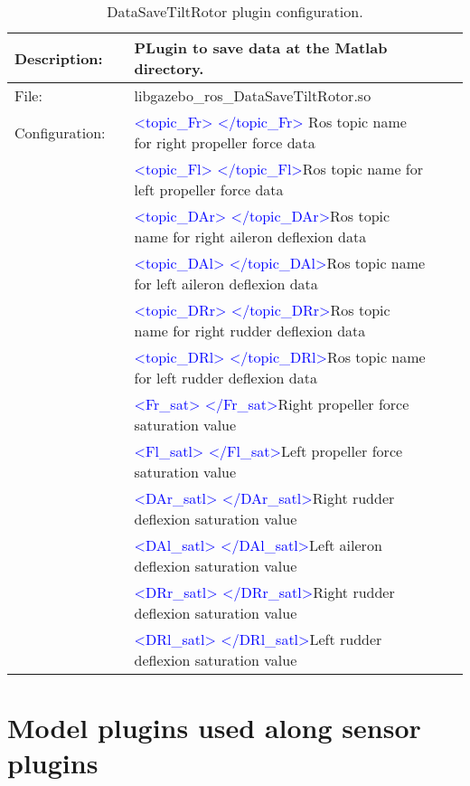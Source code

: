     \begin{table}[h]
	\centering
	\begin{tabular}{|rr|lrr|}
		\hline
		\multicolumn{1}{|l}{Description: } &       & PLugin to save data at the Matlab directory. &       &     \\
		\hline
		\multicolumn{1}{|l}{File: } &       & libgazebo\_ros\_DataSaveTiltRotor.so &       &         \\
		\hline
		\multicolumn{1}{|l}{Configuration: } &       & \textcolor{blue}{<topic\_Fr> </topic\_Fr>} Ros topic name for right propeller force data&           &  \\
		&       & \textcolor{blue}{<topic\_Fl> </topic\_Fl>}Ros topic name for left propeller force data &        &  \\
		&       & \textcolor{blue}{<topic\_DAr> </topic\_DAr>}Ros topic name for right aileron deflexion data &        &  \\
		&       & \textcolor{blue}{<topic\_DAl> </topic\_DAl>}Ros topic name for left aileron deflexion data &        &  \\
		&       & \textcolor{blue}{<topic\_DRr> </topic\_DRr>}Ros topic name for right rudder deflexion data &        &  \\
		&       & \textcolor{blue}{<topic\_DRl> </topic\_DRl>}Ros topic name for left rudder deflexion data &        &  \\
		&       & \textcolor{blue}{<Fr\_sat> </Fr\_sat>}Right propeller force saturation value &        &  \\
		&       & \textcolor{blue}{<Fl\_satl> </Fl\_sat>}Left propeller force saturation value &        &  \\
		&       & \textcolor{blue}{<DAr\_satl> </DAr\_satl>}Right rudder deflexion saturation value &        &  \\
		&       & \textcolor{blue}{<DAl\_satl> </DAl\_satl>}Left aileron deflexion saturation value &        &  \\
		&       & \textcolor{blue}{<DRr\_satl> </DRr\_satl>}Right rudder deflexion saturation value &        &  \\
		&       & \textcolor{blue}{<DRl\_satl> </DRl\_satl>}Left rudder deflexion saturation value &        &  \\	
		\hline
	\end{tabular}%
	\caption{DataSaveTiltRotor plugin configuration.}
	\label{tab:DataSaveTiltRotor}%
\end{table}%


\section{Model plugins used along sensor plugins}

